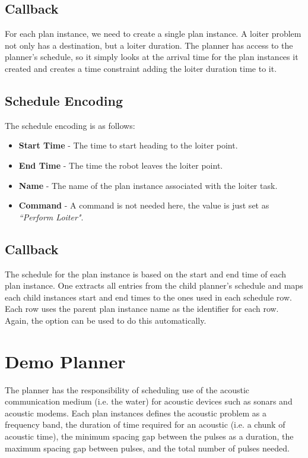\subsection{Callback }
For each  plan instance, we need to create a single  plan instance. A loiter problem not only has a destination, but a loiter duration. The  planner has access to the  planner's schedule, so it simply looks at the arrival time for the plan instances it created and creates a time constraint adding the loiter duration time to it.

\subsection{Schedule Encoding}
The schedule encoding is as follows:
\begin{itemize}
\item \textbf{Start Time} - The time to start heading to the loiter point.
\item \textbf{End Time} - The time the robot leaves the loiter point.
\item \textbf{Name} - The name of the plan instance associated with the loiter task.
\item \textbf{Command} - A command is not needed here, the value is just set as \emph{``Perform Loiter"}.
\end{itemize}

\subsection{Callback }
The schedule for the  plan instance is based on the start and end time of each  plan instance. One extracts all entries from the child planner's schedule and maps each child instances start and end times to the ones used in each  schedule row. Each row uses the parent  plan instance name as the identifier for each row. Again, the  option can be used to do this automatically.

\section{Demo  Planner}
The  planner has the responsibility of scheduling use of the acoustic communication medium (i.e. the water) for acoustic devices such as sonars and acoustic modems. Each  plan instances defines the acoustic problem as a frequency band, the duration of time required for an acoustic  (i.e. a chunk of acoustic time), the minimum spacing gap between the pulses as a duration, the maximum spacing gap between pulses, and the total number of pulses needed.

